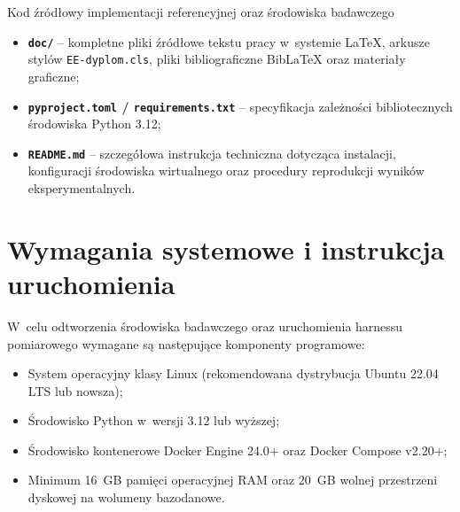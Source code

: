 \begin{easyappendix}{Kod źródłowy implementacji referencyjnej oraz środowiska badawczego}
\begin{itemize}
\begin{itemize}
        \item \texttt{plot\_generators/} -- zautomatyzowane skrypty generujące wykresy wektorowe PDF prezentowane w~rozdziale badawczym.
    \end{itemize}
    \item \textbf{\texttt{doc/}} -- kompletne pliki źródłowe tekstu pracy w~systemie \LaTeX{}, arkusze stylów \texttt{EE-dyplom.cls}, pliki bibliograficzne Bib\LaTeX{} oraz materiały graficzne;
    \item \textbf{\texttt{pyproject.toml} / \texttt{requirements.txt}} -- specyfikacja zależności bibliotecznych środowiska Python 3.12;
    \item \textbf{\texttt{README.md}} -- szczegółowa instrukcja techniczna dotycząca instalacji, konfiguracji środowiska wirtualnego oraz procedury reprodukcji wyników eksperymentalnych.
\end{itemize}

\section*{Wymagania systemowe i instrukcja uruchomienia}

W~celu odtworzenia środowiska badawczego oraz uruchomienia harnessu pomiarowego wymagane są następujące komponenty programowe:
\begin{itemize}
    \item System operacyjny klasy Linux (rekomendowana dystrybucja Ubuntu 22.04 LTS lub nowsza);
    \item Środowisko Python w~wersji 3.12 lub wyższej;
    \item Środowisko kontenerowe Docker Engine 24.0+ oraz Docker Compose v2.20+;
    \item Minimum 16~GB pamięci operacyjnej RAM oraz 20~GB wolnej przestrzeni dyskowej na wolumeny bazodanowe.
\end{itemize}


\end{easyappendix}
